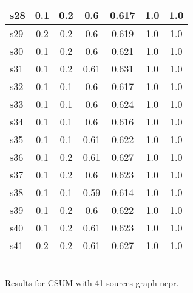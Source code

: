 \documentclass{article}
\begin{document}
\begin{tabular}{|l|c|c|c|c|c|c|}
\hline
s28 &0.1 & 0.2 & 0.6 & 0.617 & 1.0 & 1.0\\
\hline
s29 &0.2 & 0.2 & 0.6 & 0.619 & 1.0 & 1.0\\
\hline
s30 &0.1 & 0.2 & 0.6 & 0.621 & 1.0 & 1.0\\
\hline
s31 &0.1 & 0.2 & 0.61 & 0.631 & 1.0 & 1.0\\
\hline
s32 &0.1 & 0.1 & 0.6 & 0.617 & 1.0 & 1.0\\
\hline
s33 &0.1 & 0.1 & 0.6 & 0.624 & 1.0 & 1.0\\
\hline
s34 &0.1 & 0.1 & 0.6 & 0.616 & 1.0 & 1.0\\
\hline
s35 &0.1 & 0.1 & 0.61 & 0.622 & 1.0 & 1.0\\
\hline
s36 &0.1 & 0.2 & 0.61 & 0.627 & 1.0 & 1.0\\
\hline
s37 &0.1 & 0.2 & 0.6 & 0.623 & 1.0 & 1.0\\
\hline
s38 &0.1 & 0.1 & 0.59 & 0.614 & 1.0 & 1.0\\
\hline
s39 &0.1 & 0.2 & 0.6 & 0.622 & 1.0 & 1.0\\
\hline
s40 &0.1 & 0.2 & 0.61 & 0.623 & 1.0 & 1.0\\
\hline
s41 &0.2 & 0.2 & 0.61 & 0.627 & 1.0 & 1.0\\
\hline
\end{tabular}\\

\noindent Results for CSUM with 41 sources graph ncpr.
\end{document}
